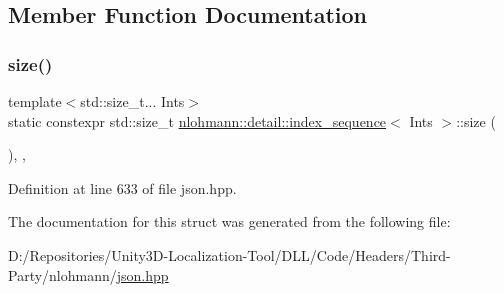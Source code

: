 \subsection{Member Function Documentation}
\mbox{\label{structnlohmann_1_1detail_1_1index__sequence_a7ac529419787d775f52408135304b337}} 
\subsubsection{\texorpdfstring{size()}{size()}}
{\footnotesize\ttfamily template$<$std\+::size\+\_\+t... Ints$>$ \\
static constexpr std\+::size\+\_\+t \mbox{\hyperlink{structnlohmann_1_1detail_1_1index__sequence}{nlohmann\+::detail\+::index\+\_\+sequence}}$<$ Ints $>$\+::size (\begin{DoxyParamCaption}{ }\end{DoxyParamCaption})\hspace{0.3cm}{\ttfamily [inline]}, {\ttfamily [static]}, {\ttfamily [noexcept]}}



Definition at line 633 of file json.\+hpp.



The documentation for this struct was generated from the following file\+:\begin{DoxyCompactItemize}
\item 
D\+:/\+Repositories/\+Unity3\+D-\/\+Localization-\/\+Tool/\+D\+L\+L/\+Code/\+Headers/\+Third-\/\+Party/nlohmann/\mbox{\hyperlink{json_8hpp}{json.\+hpp}}\end{DoxyCompactItemize}
